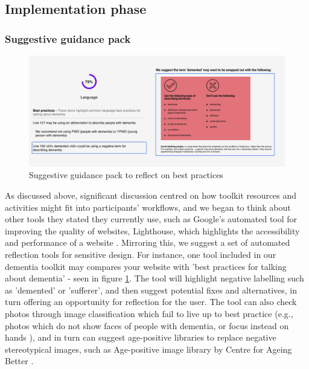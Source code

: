 \subsection{Implementation phase}
\subsubsection{Suggestive guidance pack}
\begin{figure}[h]
\centering
\includegraphics[width=1\linewidth]{Images/D3Toolkit/Fig10.png}
\caption{Suggestive guidance pack to reflect on best practices}
\label{fig:suggestPack}
\end{figure}
As discussed above, significant discussion centred on how toolkit resources and activities might fit into participants’ workflows, and we began to think about other tools they stated they currently use, such as Google’s automated tool for improving the quality of websites, Lighthouse, which highlights the accessibility and performance of a website \citep{chrome_lighthouse_2021}. Mirroring this, we suggest a set of automated reflection tools for sensitive design. For instance, one tool included in our dementia toolkit may compares your website with 'best practices for talking about dementia' - seen in figure \ref{fig:suggestPack}. The tool will highlight negative labelling such as 'demented' or 'sufferer', and then suggest potential fixes and alternatives, in turn offering an opportunity for reflection for the user. The tool can also check photos through image classification which fail to live up to best practice (e.g., photos which do not show faces of people with dementia, or focus instead on hands \citep{low2020negative}), and in turn can suggest age-positive libraries to replace negative stereotypical images, such as Age-positive image library by Centre for Ageing Better \citep{noauthor_age-positive_nodate}.

